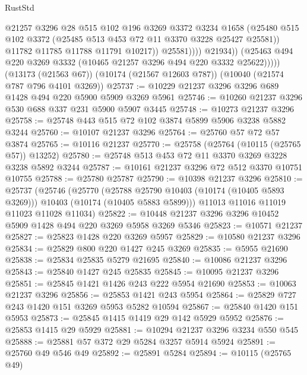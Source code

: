 \begin{lexlean}{RustStd}
\begin{coremodule}
                          @21257
                          @3296
                          @28
                          @515
                          @102
                          @196
                          @3269
                          @3372
                          @3234
                          @1658
                          (@25480
                            @515
                            @102
                            @3372
                            (@25485 @513 @453 @72 @11 @3370 @3228 @25427 @25581))
                          @11782
                          @11785
                          @11788
                          @11791
                          @10217))
                      @25581))))
              @21934))
          (@25463 @494 @220 @3269 @3332 (@10465 @21257 @3296 @494 @220 @3332 @25622)))))
    (@13173 (@21563 @67))
    (@10174 (@21567 @12603 @787))
    (@10040 (@21574 @787 @796 @4101 @3269))
@25737 := @10229 @21237 @3296 @3296 @689 @1428 @494 @220 @5900 @5909 @3269 @5961
@25746 := @10260 @21237 @3296 @530 @688 @337 @231 @5900 @5907 @3445
@25748 := @10273 @21237 @3296
@25758 := @25748 @443 @515 @72 @102 @3874 @5899 @5906 @3238 @5882 @3244
@25760 := @10107 @21237 @3296
@25764 := @25760 @57 @72 @57 @3874
@25765 := @10116 @21237
@25770 := @25758 (@25764 (@10115 (@25765 @57)) @13252)
@25780 := @25748 @513 @453 @72 @11 @3370 @3269 @3228 @3238 @5892 @3244
@25787 := @10161 @21237 @3296 @72 @512 @3370 @10751 @10755
@25788 := @25780 @25787
@25790 := @10398 @21237 @3296
@25810 := @25737
    (@25746
      (@25770
        (@25788 @25790 @10403 (@10174 (@10405 @5893 @3269)))
        @10403
        (@10174 (@10405 @5883 @5899)))
      @11013
      @11016
      @11019
      @11023
      @11028
      @11034)
@25822 := @10448 @21237 @3296 @3296 @10452 @5909 @1428 @494 @220 @3269 @5958 @3269 @5346
@25823 := @10571 @21237
@25827 := @25823 @1428 @220 @3269 @5957
@25829 := @10580 @21237 @3296
@25834 := @25829 @800 @220 @1427 @245 @3269
@25835 := @5955 @21690
@25838 := @25834 @25835 @5279 @21695
@25840 := @10086 @21237 @3296
@25843 := @25840 @1427 @245 @25835
@25845 := @10095 @21237 @3296
@25851 := @25845 @1421 @1426 @243 @222 @5954 @21690
@25853 := @10063 @21237 @3296
@25856 := @25853 @1421 @243 @5954
@25864 := @25829 @727 @243 @1420 @151 @3269 @5953 @5282 @10594
@25867 := @25840 @1420 @151 @5953
@25873 := @25845 @1415 @1419 @29 @142 @5929 @5952
@25876 := @25853 @1415 @29 @5929
@25881 := @10294 @21237 @3296 @3234 @550 @545
@25888 := @25881 @57 @372 @29 @5284 @3257 @5914 @5924
@25891 := @25760 @49 @546 @49
@25892 := @25891 @5284
@25894 := @10115 (@25765 @49)

\end{coremodule}
\end{lexlean}
